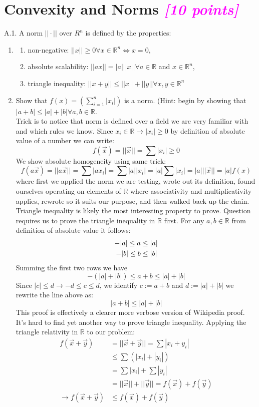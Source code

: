 \documentclass{article}
\newcommand{\field}[1]{\mathbb{#1}}
\newcommand{\1}{\mathbf{1}}
\newcommand{\R}{\field{R}} %
\newcommand{\points}[1]{\small\textcolor{magenta}{\emph{[#1 points]}} \normalsize}
\begin{document}
\section*{Convexity and Norms \points{10}}
A.1. A norm $||\cdot||$ over $R^n$ is defined by the properties:
\begin{enumerate}
\item[] \begin{enumerate}
    \item non-negative: $||x||\ge 0 \forall x \in \R^n \iff x= 0$,
    \item absolute scalability: $||ax|| = |a| ||x|| \forall a \in \R$  and $x\in\R^n$,
    \item triangle inequality: $||x+y|| \le ||x|| + ||y|| \forall x,y \in \R^n$
\end{enumerate}

\item Show that $f(x) = (\sum^n_{i=1}|x_i|)$ is a norm. (Hint: begin by showing that $|a+b| \leq |a|+|b| \forall a,b \in \R$. \\
Trick is to notice that norm is defined over a field we are very familiar with and which rules we know. Since $x_i\in\R \rightarrow |x_i|\geq 0$ by definition of absolute value of a number we can write:
$$f(\vec x) = ||\vec x|| = \sum |x_i| \geq 0$$
We show absolute homogeneity using same trick:
$$f(a\vec x)= ||a\vec x|| = \sum |ax_i| = \sum |a||x_i| = |a|\sum|x_i| = |a|||\vec x|| = |a|f(x)$$
where first we applied the norm we are testing, wrote out its definition, found ourselves operating on elements of $\R$ where associativity and multiplicativity applies, rewrote so it suits our purpose, and then walked back up the chain. Triangle inequality is likely the most interesting property to prove. Question requires us to prove the triangle inequality in $\R$ first. For any $a,b\in\R$ from definition of absolute value it follows:
\begin{align*}
\centering
    -|a|\leq a &\leq |a| \\
    -|b|\leq b &\leq |b|
\end{align*}
Summing the first two rows we have 
$$-(|a|+|b|)\leq a + b \leq |a| + |b| $$
Since $|c|\leq d \rightarrow -d \leq c \leq d$, we identify $c:=a+b$ and $d:=|a|+|b|$ we rewrite the line above as:
$$|a+b|\leq |a|+|b|$$
This proof is effectively a clearer more verbose version of Wikipedia proof. It's hard to find yet another way to prove triangle inequality. Applying the triangle relativity in $\R$ to our problem:
\begin{align*}
    f(\vec x + \vec y) &= ||\vec x + \vec y|| = \sum |x_i + y_i| \\
    & \leq \sum \left( |x_i| + |y_i|\right) \\
    &= \sum |x_i| + \sum |y_i| \\
    & = ||\vec x|| + ||\vec y|| = f(\vec x) + f(\vec y) \\
    \rightarrow f(\vec x + \vec y) &\leq f(\vec x) + f(\vec y) 
\end{align*}{}


\end{enumerate}
\end{document}
